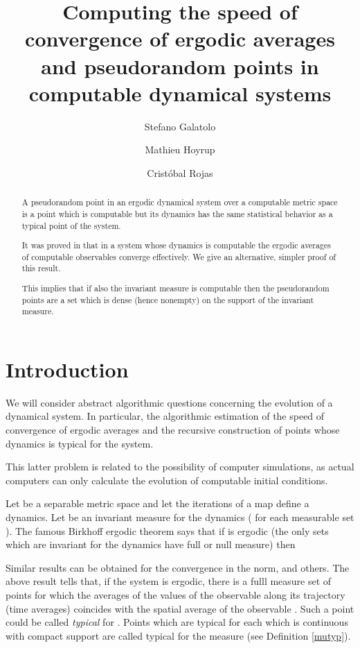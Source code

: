 \documentclass[copyright,creativecommons]{eptcs}
\title{Computing
the speed of convergence of ergodic averages and pseudorandom points in
computable dynamical systems}
\author{Stefano Galatolo
\institute{Dipartiento di matematica applicata \\
Universita di Pisa}
\email{s.galatolo@ing.unipi.it}
\and
Mathieu Hoyrup  \qquad\qquad
\institute{LORIA, Vandoeuvre-l es-Nancy, France}
\email{Mathieu.Hoyrup@loria.fr}
\and
Crist\' obal Rojas \qquad\qquad
\institute{Fields Institute, Toronto, Canada}
\email{ cristobal.rojas@utoronto.ca}
}
\numberwithin{equation}{section}
\begin{document}
\maketitle

\begin{abstract}
A pseudorandom point in an ergodic dynamical system over a computable metric
space is a point which is computable but its dynamics has the same
statistical behavior as a typical point of the system.

It was proved in \cite{AvigadGT10} that in a system whose dynamics is
computable the ergodic averages of computable observables converge
effectively. We give an alternative, simpler proof of this result.

This implies that if also the invariant measure is computable then the
pseudorandom points are a set which is dense (hence nonempty) on the support
of the invariant measure.
\end{abstract}

\section{Introduction}
We will consider abstract algorithmic questions concerning the evolution of
a dynamical system. In particular, the algorithmic estimation of the speed
of convergence of ergodic averages and the recursive construction of points
whose dynamics is typical for the system.

This latter problem is related to the possibility of computer simulations,
as actual computers can only calculate the evolution of computable initial
conditions.

Let  be a separable metric space and let the iterations of a map 
define a dynamics. Let  be an invariant measure for the dynamics ( for each measurable set ). The famous Birkhoff
ergodic theorem says that if  is ergodic (the only sets which are
invariant for the dynamics have full or null measure) then

Similar results can be obtained for the convergence in the  norm, and
others. The above result tells that, if the system is ergodic, there is a
fulll measure set of points for which the averages of the values of the
observable  along its trajectory (time averages) coincides with the
spatial average of the observable . Such a point could be called \textit{typical }for  . Points which are typical for each  which is continuous
with compact support are called typical for the measure  (see
Definition \ref{mutyp}).
\end{document}
